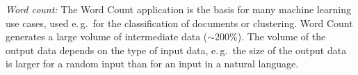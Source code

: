 \documentclass{acm_proc_article-sp}
\newcommand{\jhanote}[1]{ {\textcolor{red} { ***SJ: #1 }}}
\newcommand{\alnote}[1]{ {\textcolor{blue} { ***andreL: #1 }}}
\newcommand{\alnote}[1]{}
\newcommand{\jhanote}[1]{}
\newcommand{\upp}{\vspace*{-0.5em}}
\newcommand{\pilotmapreduce}{Pilot-MapReduce\xspace}
\begin{document}


{\it Word count:} The Word Count application is the basis for many machine
learning use cases, used e.\,g.\ for the classification of documents or
clustering. Word Count generates a large volume of intermediate data
($\sim$200$\%$). The volume of the output data depends on the type of input
data, e.\,g.\ the size of the output data is larger for a random input than for
an input in a natural language.

\end{document}
